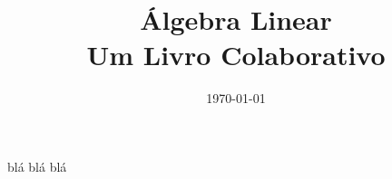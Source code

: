 \documentclass[a4paper]{book}
\theoremstyle{plain}
\theoremstyle{definition}
\begin{document}
\newcommand{\dir}{.} 

\frontmatter

\title{Álgebra Linear\\\small{Um Livro Colaborativo}}

\author{}

\date{\today}

\maketitle

blá blá blá
\end{document}
